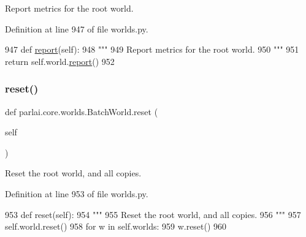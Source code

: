 \begin{DoxyVerb}Report metrics for the root world.
\end{DoxyVerb}
 

Definition at line 947 of file worlds.\+py.


\begin{DoxyCode}
947     \textcolor{keyword}{def }\hyperlink{namespaceprojects_1_1convai2_1_1eval__f1_a01a47b9c08dad189837a51f085defc45}{report}(self):
948         \textcolor{stringliteral}{"""}
949 \textcolor{stringliteral}{        Report metrics for the root world.}
950 \textcolor{stringliteral}{        """}
951         \textcolor{keywordflow}{return} self.world.\hyperlink{namespaceprojects_1_1convai2_1_1eval__f1_a01a47b9c08dad189837a51f085defc45}{report}()
952 
\end{DoxyCode}
\mbox{\label{classparlai_1_1core_1_1worlds_1_1BatchWorld_a00ba541479129163a13a0377797504e1}} 
\subsubsection{\texorpdfstring{reset()}{reset()}}
{\footnotesize\ttfamily def parlai.\+core.\+worlds.\+Batch\+World.\+reset (\begin{DoxyParamCaption}\item[{}]{self }\end{DoxyParamCaption})}

\begin{DoxyVerb}Reset the root world, and all copies.
\end{DoxyVerb}
 

Definition at line 953 of file worlds.\+py.


\begin{DoxyCode}
953     \textcolor{keyword}{def }reset(self):
954         \textcolor{stringliteral}{"""}
955 \textcolor{stringliteral}{        Reset the root world, and all copies.}
956 \textcolor{stringliteral}{        """}
957         self.world.reset()
958         \textcolor{keywordflow}{for} w \textcolor{keywordflow}{in} self.worlds:
959             w.reset()
960 
\end{DoxyCode}
\mbox{\label{classparlai_1_1core_1_1worlds_1_1BatchWorld_a16a31209d87f0f9bf27871110bd63aa6}} 
